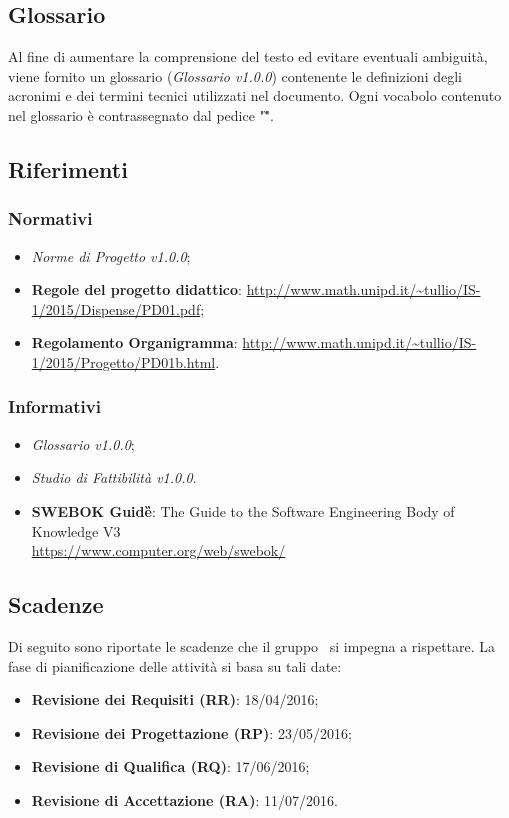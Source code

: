\subsection{Glossario}
Al fine di aumentare la comprensione del testo ed evitare eventuali ambiguità, 
viene fornito un glossario (\textit{Glossario v1.0.0}) contenente le 
definizioni degli acronimi e dei termini tecnici utilizzati nel documento. Ogni 
vocabolo contenuto nel glossario è contrassegnato dal pedice "\G ".

\subsection{Riferimenti}

\subsubsection{Normativi}
\begin{itemize}
\item \textit{Norme di Progetto v1.0.0};
\item \textbf{Regole del progetto didattico}: \url{http://www.math.unipd.it/~tullio/IS-1/2015/Dispense/PD01.pdf};
\item \textbf{Regolamento Organigramma}: \url{http://www.math.unipd.it/~tullio/IS-1/2015/Progetto/PD01b.html}.
\end{itemize}

\subsubsection{Informativi}
\begin{itemize}
\item \textit{Glossario v1.0.0};
\item \textit{Studio di Fattibilità v1.0.0}.
\item \textbf{SWEBOK Guide\G}: The Guide to the Software Engineering Body of Knowledge V3 \\ \url{https://www.computer.org/web/swebok/}
\end{itemize}
 

\subsection{Scadenze}
Di seguito sono riportate le scadenze che il gruppo \GRUPPO\ si impegna a rispettare. La fase di pianificazione delle attività si basa su tali date:
\begin{itemize}
\item \textbf{Revisione dei Requisiti (RR)}: 18/04/2016;
\item \textbf{Revisione dei Progettazione (RP)}: 23/05/2016;
\item \textbf{Revisione di Qualifica (RQ)}: 17/06/2016;
\item \textbf{Revisione di Accettazione (RA)}:  11/07/2016.
\end{itemize}

